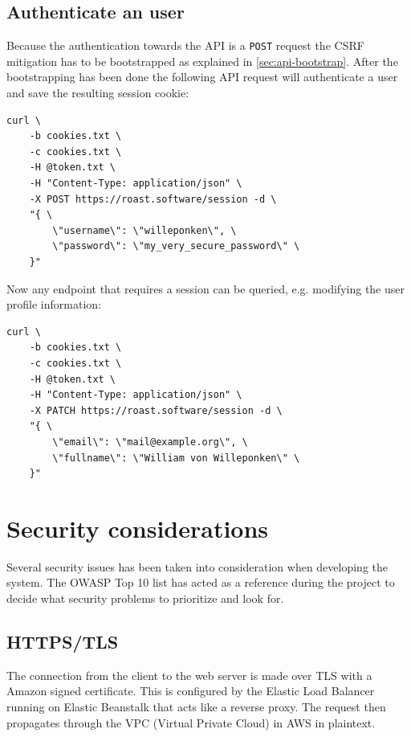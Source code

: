 \documentclass[12pt,a4paper]{report}
\begin{document}
\section{Authenticate an user}
Because the authentication towards the API is a \texttt{POST} request the CSRF mitigation has to be bootstrapped as explained in \autoref{sec:api-bootstrap}. After the bootstrapping has been done the following API request will authenticate a user and save the resulting session cookie:
\begin{verbatim}
curl \
    -b cookies.txt \
    -c cookies.txt \
    -H @token.txt \
    -H "Content-Type: application/json" \
    -X POST https://roast.software/session -d \
    "{ \
        \"username\": \"willeponken\", \
        \"password\": \"my_very_secure_password\" \
    }"
\end{verbatim}

Now any endpoint that requires a session can be queried, e.g. modifying the user profile information:
\begin{verbatim}
curl \
    -b cookies.txt \
    -c cookies.txt \
    -H @token.txt \
    -H "Content-Type: application/json" \
    -X PATCH https://roast.software/session -d \
    "{ \
        \"email\": \"mail@example.org\", \
        \"fullname\": \"William von Willeponken\" \
    }"
\end{verbatim}


\newpage

\chapter{Security considerations}
Several security issues has been taken into consideration when developing the system. The OWASP Top 10 list\cite{owasp-top-10} has acted as a reference during the project to decide what security problems to prioritize and look for.

\section{HTTPS/TLS}
The connection from the client to the web server is made over TLS with a Amazon signed certificate.
This is configured by the Elastic Load Balancer running on Elastic Beanstalk that acts like a reverse proxy.
The request then propagates through the VPC (Virtual Private Cloud) in AWS in plaintext. 
\end{document}
